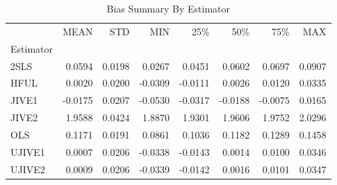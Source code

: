 \begin{table}[ht]
\centering
\caption{Bias Summary By Estimator}
\begin{tabular}{lrrrrrrr}
\toprule
 & MEAN & STD & MIN & 25\% & 50\% & 75\% & MAX \\
Estimator &  &  &  &  &  &  &  \\
\midrule
2SLS & 0.0594 & 0.0198 & 0.0267 & 0.0451 & 0.0602 & 0.0697 & 0.0907 \\
HFUL & 0.0020 & 0.0200 & -0.0309 & -0.0111 & 0.0026 & 0.0120 & 0.0335 \\
JIVE1 & -0.0175 & 0.0207 & -0.0530 & -0.0317 & -0.0188 & -0.0075 & 0.0165 \\
JIVE2 & 1.9588 & 0.0424 & 1.8870 & 1.9301 & 1.9606 & 1.9752 & 2.0296 \\
OLS & 0.1171 & 0.0191 & 0.0861 & 0.1036 & 0.1182 & 0.1289 & 0.1458 \\
UJIVE1 & 0.0007 & 0.0206 & -0.0338 & -0.0143 & 0.0014 & 0.0100 & 0.0346 \\
UJIVE2 & 0.0009 & 0.0206 & -0.0339 & -0.0142 & 0.0016 & 0.0101 & 0.0347 \\
\bottomrule
\end{tabular}
\end{table}

